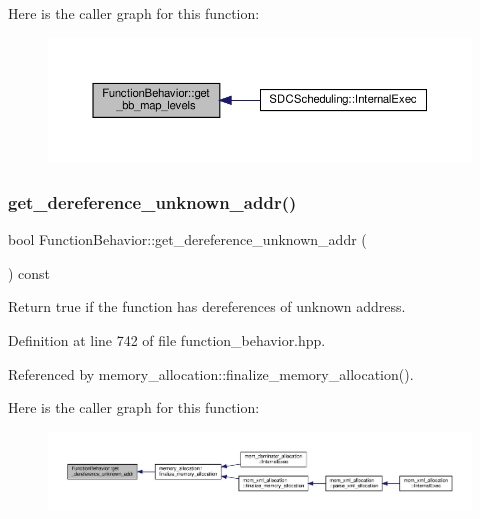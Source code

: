 Here is the caller graph for this function\+:
\nopagebreak
\begin{figure}[H]
\begin{center}
\leavevmode
\includegraphics[width=350pt]{d9/d45/classFunctionBehavior_afe9b9b0f9c7be3f3808bf34e0050b7f3_icgraph}
\end{center}
\end{figure}
\mbox{\label{classFunctionBehavior_a03f2a6f7c22f07616ed9de65e8e53d92}} 
\subsubsection{\texorpdfstring{get\+\_\+dereference\+\_\+unknown\+\_\+addr()}{get\_dereference\_unknown\_addr()}}
{\footnotesize\ttfamily bool Function\+Behavior\+::get\+\_\+dereference\+\_\+unknown\+\_\+addr (\begin{DoxyParamCaption}{ }\end{DoxyParamCaption}) const\hspace{0.3cm}{\ttfamily [inline]}}



Return true if the function has dereferences of unknown address. 



Definition at line 742 of file function\+\_\+behavior.\+hpp.



Referenced by memory\+\_\+allocation\+::finalize\+\_\+memory\+\_\+allocation().

Here is the caller graph for this function\+:
\nopagebreak
\begin{figure}[H]
\begin{center}
\leavevmode
\includegraphics[width=350pt]{d9/d45/classFunctionBehavior_a03f2a6f7c22f07616ed9de65e8e53d92_icgraph}
\end{center}
\end{figure}
\mbox{\label{classFunctionBehavior_a47651145548f49e5609bb5bc90cb318e}} 
